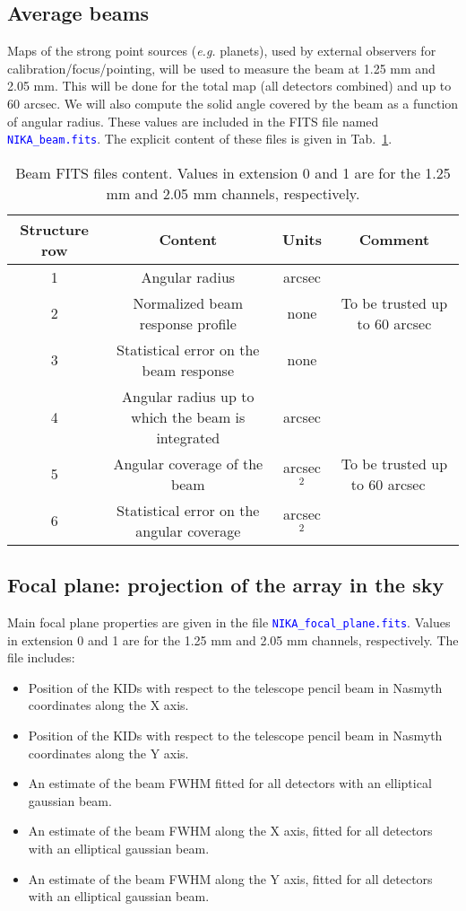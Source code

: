 \documentclass[a4paper,10pt]{article}
\begin{document}
\subsection{Average beams}
Maps of the strong point sources ({\it e.g.} planets), used by external observers for calibration/focus/pointing, will be used to measure the beam at 1.25 mm and 2.05 mm. This will be done for the total map (all detectors combined) and up to 60 arcsec. We will also compute the solid angle covered by the beam as a function of angular radius. These values are included in the FITS file named \textcolor{blue}{{\tt NIKA\_beam.fits}}. The explicit content of these files is given in Tab.~\ref{tab:beam}.
	\begin{table}[ht]
	\begin{center}
	\begin{tabular}{|c|c|c|c|}
         \hline
	Structure row & Content & Units & Comment \\
	\hline
        1 & Angular radius & arcsec & \\
        2 & Normalized beam response profile & none & To be trusted up to 60 arcsec \\
        3 & Statistical error on the beam response & none &  \\
        4 & Angular radius up to which the beam is integrated & arcsec & \\
        5 & Angular coverage of the beam & arcsec$^2$ & To be trusted up to 60 arcsec \ \\
        6 & Statistical error on the angular coverage & arcsec$^2$ & \\
	\hline
	\end{tabular}
	\end{center}
	\caption{Beam FITS files content.  Values in extension 0 and 1 are for the 1.25 mm and 2.05 mm channels, respectively.}
	\label{tab:beam}
	\end{table}

\subsection{Focal plane: projection of the array in the sky}
Main focal plane properties are given in the file \textcolor{blue}{{\tt NIKA\_focal\_plane.fits}}. Values in extension 0 and 1 are for the 1.25 mm and 2.05 mm channels, respectively. 
The file includes:
\begin{itemize}
\item Position of the KIDs with respect to the telescope pencil beam in Nasmyth coordinates along the X axis.
\item Position of the KIDs with respect to the telescope pencil beam in Nasmyth coordinates along the Y axis.
\item An estimate of the beam FWHM fitted for all detectors with an elliptical gaussian beam.
\item An estimate of the beam FWHM along the X axis, fitted for all detectors with an elliptical gaussian beam.
\item An estimate of the beam FWHM along the Y axis, fitted for all detectors with an elliptical gaussian beam.
\end{itemize}
\end{document}
